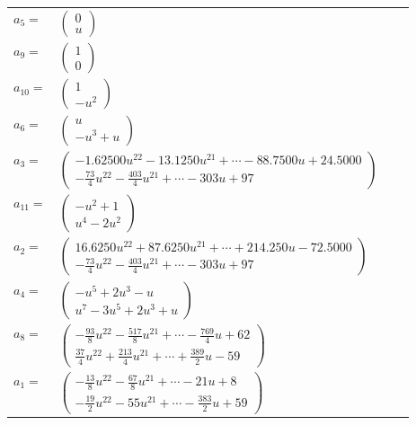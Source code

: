 \documentclass[1p]{elsarticle_modified}
\theoremstyle{definition}
\begin{document}
\begin{tabular}{m{7pt} m{180pt} m{7pt} m{180pt} }
\flushright $a_{5}=$&$\begin{pmatrix}0\\u\end{pmatrix}$ \\
\flushright $a_{9}=$&$\begin{pmatrix}1\\0\end{pmatrix}$ \\
\flushright $a_{10}=$&$\begin{pmatrix}1\\- u^2\end{pmatrix}$ \\
\flushright $a_{6}=$&$\begin{pmatrix}u\\- u^3+u\end{pmatrix}$ \\
\flushright $a_{3}=$&$\begin{pmatrix}-1.62500 u^{22}-13.1250 u^{21}+\cdots-88.7500 u+24.5000\\-\frac{73}{4} u^{22}-\frac{403}{4} u^{21}+\cdots-303 u+97\end{pmatrix}$ \\
\flushright $a_{11}=$&$\begin{pmatrix}- u^2+1\\u^4-2 u^2\end{pmatrix}$ \\
\flushright $a_{2}=$&$\begin{pmatrix}16.6250 u^{22}+87.6250 u^{21}+\cdots+214.250 u-72.5000\\-\frac{73}{4} u^{22}-\frac{403}{4} u^{21}+\cdots-303 u+97\end{pmatrix}$ \\
\flushright $a_{4}=$&$\begin{pmatrix}- u^5+2 u^3- u\\u^7-3 u^5+2 u^3+u\end{pmatrix}$ \\
\flushright $a_{8}=$&$\begin{pmatrix}-\frac{93}{8} u^{22}-\frac{517}{8} u^{21}+\cdots-\frac{769}{4} u+62\\\frac{37}{4} u^{22}+\frac{213}{4} u^{21}+\cdots+\frac{389}{2} u-59\end{pmatrix}$ \\
\flushright $a_{1}=$&$\begin{pmatrix}-\frac{13}{8} u^{22}-\frac{67}{8} u^{21}+\cdots-21 u+8\\-\frac{19}{2} u^{22}-55 u^{21}+\cdots-\frac{383}{2} u+59\end{pmatrix}$ \\

\end{tabular}
\end{document}
